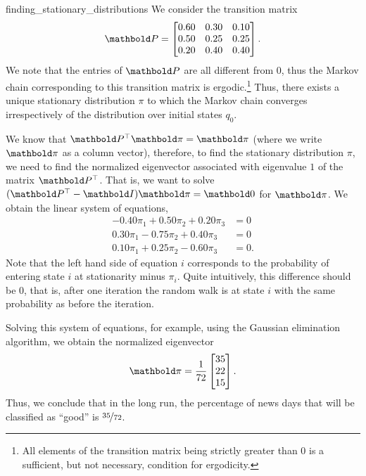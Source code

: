 \begin{solution}{finding_stationary_distributions}
  We consider the transition matrix \begin{align*}
    \mP = \begin{bmatrix}
      0.60 & 0.30 & 0.10 \\
      0.50 & 0.25 & 0.25 \\
      0.20 & 0.40 & 0.40 \\
    \end{bmatrix}.
  \end{align*}
  We note that the entries of $\mP$ are all different from $0$, thus the Markov chain corresponding to this transition matrix is ergodic.\footnote{All elements of the transition matrix being strictly greater than $0$ is a sufficient, but not necessary, condition for ergodicity.}
  Thus, there exists a unique stationary distribution $\pi$ to which the Markov chain converges irrespectively of the distribution over initial states $q_0$.

  We know that $\transpose{\mP}\vpi = \vpi$ (where we write $\vpi$ as a column vector), therefore, to find the stationary distribution $\pi$, we need to find the normalized eigenvector associated with eigenvalue $1$ of the matrix $\transpose{\mP}$.
  That is, we want to solve $(\transpose{\mP} - \mI) \vpi = \vzero$ for $\vpi$.
  We obtain the linear system of equations, \begin{align*}
    -0.40 \pi_1 + 0.50 \pi_2 + 0.20 \pi_3 &= 0 \\
    0.30 \pi_1 - 0.75 \pi_2 + 0.40 \pi_3 &= 0 \\
    0.10 \pi_1 + 0.25 \pi_2 - 0.60 \pi_3 &= 0.
  \end{align*}
  Note that the left hand side of equation $i$ corresponds to the probability of entering state $i$ at stationarity minus $\pi_i$.
  Quite intuitively, this difference should be $0$, that is, after one iteration the random walk is at state $i$ with the same probability as before the iteration.

  Solving this system of equations, for example, using the Gaussian elimination algorithm, we obtain the normalized eigenvector \begin{align*}
    \vpi = \frac{1}{72} \begin{bmatrix}
      35 \\ 22 \\ 15
    \end{bmatrix}.
  \end{align*}
  Thus, we conclude that in the long run, the percentage of news days that will be classified as ``good'' is $\nicefrac{35}{72}$.
\end{solution}

